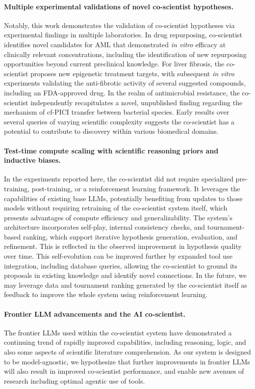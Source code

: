 \paragraph{Multiple experimental validations of novel co-scientist hypotheses.} Notably, this work demonstrates the validation of co-scientist hypotheses via experimental findings in multiple laboratories. In drug repurposing, co-scientist identifies novel candidates for AML that demonstrated \textit{in vitro} efficacy at clinically relevant concentrations, including the identification of new repurposing opportunities beyond current preclinical knowledge. For liver fibrosis, the co-scientist proposes new epigenetic treatment targets, with subsequent \textit{in vitro} experiments validating the anti-fibrotic activity of several suggested compounds, including an FDA-approved drug. In the realm of antimicrobial resistance, the co-scientist independently recapitulates a novel, unpublished finding regarding the mechanism of cf-PICI transfer between bacterial species. Early results over several queries of varying scientific complexity suggests the co-scientist has a potential to contribute to discovery within various biomedical domains.

\paragraph{Test-time compute scaling with scientific reasoning priors and inductive biases.} In the experiments reported here, the co-scientist did not require specialized pre-training, post-training, or a reinforcement learning framework. It leverages the capabilities of existing base LLMs, potentially benefiting from updates to those models without requiring retraining of the co-scientist system itself, which presents advantages of compute efficiency and generalizability. The system's architecture incorporates self-play, internal consistency checks, and tournament-based ranking, which support iterative hypothesis generation, evaluation, and refinement. This is reflected in the observed improvement in hypothesis quality over time. This self-evolution can be improved further by expanded tool use integration, including database queries, allowing the co-scientist to ground its proposals in existing knowledge and identify novel connections. In the future, we may leverage data and tournament ranking generated by the co-scientist itself as feedback to improve the whole system using reinforcement learning.

\paragraph{Frontier LLM advancements and the AI co-scientist.}
The frontier LLMs used within the co-scientist system have demonstrated a continuing trend of rapidly improved capabilities, including reasoning, logic, and also some aspects of scientific literature comprehension. As our system is designed to be model-agnostic, we hypothesize that further improvements in frontier LLMs will also result in improved co-scientist performance, and enable new avenues of research including optimal agentic use of tools.

